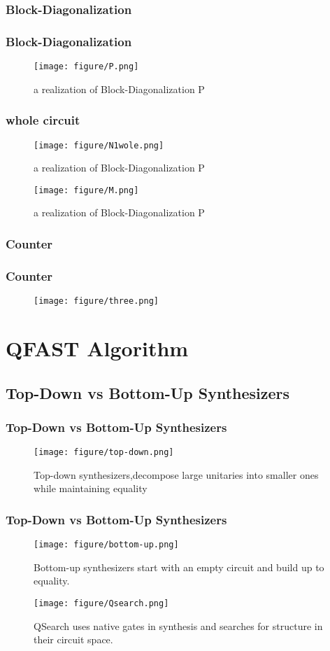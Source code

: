 \documentclass[aspectratio=1610]{beamer}
\begin{document}
\subsubsection{Block-Diagonalization}
\begin{frame}
\frametitle{Block-Diagonalization}
\begin{figure}
  \texttt{[image: figure/P.png]}
  \caption{a realization of Block-Diagonalization P}
\end{figure}
\end{frame}
\begin{frame}
  \frametitle{whole circuit}
  \begin{figure}
    \texttt{[image: figure/N1wole.png]}
    \caption{a realization of Block-Diagonalization P}
  \end{figure}
  \begin{figure}
    \texttt{[image: figure/M.png]}
    \caption{a realization of Block-Diagonalization P}
  \end{figure}
\end{frame}
\subsubsection{Counter}
\begin{frame}
\frametitle{Counter}
  \begin{figure}
    \texttt{[image: figure/three.png]}
  \end{figure}

\end{frame}

\section{QFAST Algorithm}

\subsection{Top-Down vs Bottom-Up Synthesizers}
\begin{frame}
\frametitle{Top-Down vs Bottom-Up Synthesizers}
\begin{figure}
  \texttt{[image: figure/top-down.png]}
  \caption{Top-down synthesizers,decompose large unitaries into smaller ones while maintaining equality}
\end{figure}
\end{frame}
\begin{frame}
  \frametitle{Top-Down vs Bottom-Up Synthesizers}
  \begin{figure}
    \texttt{[image: figure/bottom-up.png]}
    \caption{Bottom-up synthesizers start with an empty circuit and build up to equality.}
  \end{figure}
  \begin{figure}
    \texttt{[image: figure/Qsearch.png]}
    \caption{QSearch uses native gates in synthesis and searches for structure in their circuit space.}
  \end{figure}
\end{frame}
\end{document}
